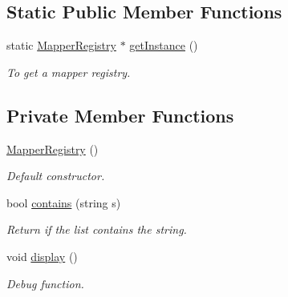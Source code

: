 \subsection*{Static Public Member Functions}
\begin{DoxyCompactItemize}
\item 
\hypertarget{classMapperRegistry_a8bf1cd8b9de66c62ede81c2b0c018790}{
static \hyperlink{classMapperRegistry}{MapperRegistry} $\ast$ \hyperlink{classMapperRegistry_a8bf1cd8b9de66c62ede81c2b0c018790}{getInstance} ()}
\label{classMapperRegistry_a8bf1cd8b9de66c62ede81c2b0c018790}

\begin{DoxyCompactList}\small\item\em To get a mapper registry. \item\end{DoxyCompactList}\end{DoxyCompactItemize}
\subsection*{Private Member Functions}
\begin{DoxyCompactItemize}
\item 
\hypertarget{classMapperRegistry_ae7a8adc711750042d3b157dda5810887}{
\hyperlink{classMapperRegistry_ae7a8adc711750042d3b157dda5810887}{MapperRegistry} ()}
\label{classMapperRegistry_ae7a8adc711750042d3b157dda5810887}

\begin{DoxyCompactList}\small\item\em Default constructor. \item\end{DoxyCompactList}\item 
bool \hyperlink{classMapperRegistry_a396daab59d9e55eaafcdbcbdfcf6ef71}{contains} (string s)
\begin{DoxyCompactList}\small\item\em Return if the list contains the string. \item\end{DoxyCompactList}\item 
\hypertarget{classMapperRegistry_a9c3214192adad8555edefd69bd513934}{
void \hyperlink{classMapperRegistry_a9c3214192adad8555edefd69bd513934}{display} ()}
\label{classMapperRegistry_a9c3214192adad8555edefd69bd513934}

\begin{DoxyCompactList}\small\item\em Debug function. \item\end{DoxyCompactList}\end{DoxyCompactItemize}
